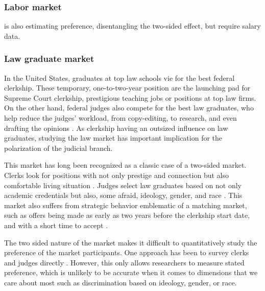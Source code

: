 \subsubsection{Labor market}

\citep{Abowd1999} is also estimating preference, disentangling the two-sided
effect, but require salary data.

\subsubsection{Law graduate market}

In the United States, graduates at top law schools vie for the best federal
clerkship. These temporary, one-to-two-year position are the launching pad for Supreme Court clerkship,
prestigious teaching jobs or positions at top law firms. On the other hand,
federal judges also compete for the best law graduates, who help reduce the
judges' workload, from copy-editing, to research, and even drafting the opinions
\citep[795]{Gulati2016, Posner2001}. As clerkship having an outsized influence
on law graduates, studying the law market has important implication for the
polarization of the judicial branch.

This market has long been recognized as a classic case of a two-sided market.
Clerks look for positions with not only prestige and connection but also
comfortable living situation \citep{Posner2001}. Judges select law graduates
based on not only academic credentials but also, some afraid, ideology, gender,
and race \citep{Slotnick1984}. This market also suffers from strategic behavior
emblematic of a matching market, such as offers being
made as early as two years before the clerkship start date, and with a short time to accept \citep{Posner2001, Posner2007}.

The two sided nature of the market makes it difficult to quantitatively study the preference
of the market participants. One approach has been to survey clerks and judges
directly \citep{Peppers2008}. However, this only allows researchers to measure
stated preference, which is unlikely to be accurate when it comes to dimensions
that we care about most such as discrimination based on ideology, gender, or
race.

